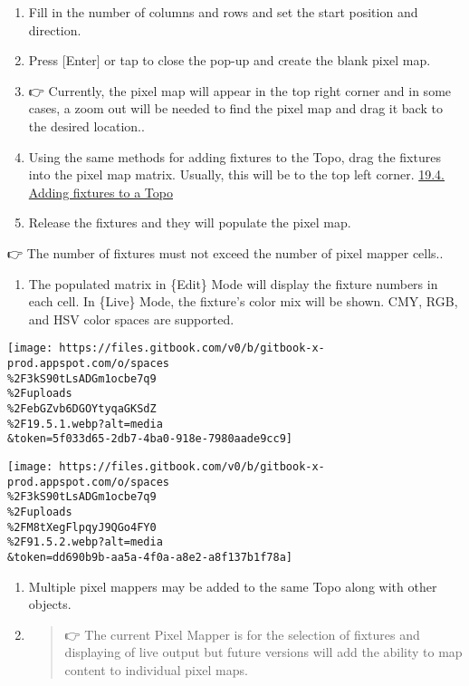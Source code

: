 \documentclass[
]{article}
\providecommand{\tightlist}{%
  \setlength{\itemsep}{0pt}\setlength{\parskip}{0pt}}
\begin{document}
\begin{enumerate}
\def\labelenumi{\arabic{enumi}.}
\setcounter{enumi}{2}
\item
  Fill in the number of columns and rows and set the start position and direction.
\item
  Press {[}Enter{]} or tap \href{image.png}{} to close the pop-up and create the blank pixel map.
\item
  👉 {Currently, the pixel map will appear in the top right corner and in some cases, a zoom out will be needed to find the pixel map and drag it back to the desired location.}.
\item
  Using the same methods for adding fixtures to the Topo, drag the fixtures into the pixel map matrix. Usually, this will be to the top left corner. \href{https://vibemanual.compulite.com/topo-topographical-display.html\#adding-fixtures-to-a-topo}{19.4. Adding fixtures to a Topo}
\item
  Release the fixtures and they will populate the pixel map.
\end{enumerate}

👉 {The number of fixtures must not exceed the number of pixel mapper cells.}.

\begin{enumerate}
\def\labelenumi{\arabic{enumi}.}
\setcounter{enumi}{4}
\tightlist
\item
  The populated matrix in \{Edit\} Mode will display the fixture numbers in each cell. In \{Live\} Mode, the fixture's color mix will be shown. CMY, RGB, and HSV color spaces are supported.
\end{enumerate}

\texttt{[image: https://files.gitbook.com/v0/b/gitbook-x-prod.appspot.com/o/spaces\\\%2F3kS90tLsADGm1ocbe7q9\\\%2Fuploads\\\%2FebGZvb6DGOYtyqaGKSdZ\\\%2F19.5.1.webp?alt=media\\\&token=5f033d65-2db7-4ba0-918e-7980aade9cc9]}

\texttt{[image: https://files.gitbook.com/v0/b/gitbook-x-prod.appspot.com/o/spaces\\\%2F3kS90tLsADGm1ocbe7q9\\\%2Fuploads\\\%2FM8tXegFlpqyJ9QGo4FY0\\\%2F91.5.2.webp?alt=media\\\&token=dd690b9b-aa5a-4f0a-a8e2-a8f137b1f78a]}

\begin{enumerate}
\def\labelenumi{\arabic{enumi}.}
\item
  Multiple pixel mappers may be added to the same Topo along with other objects.
\item
  \begin{quote}
  👉 The current Pixel Mapper is for the selection of fixtures and displaying of live output but future versions will add the ability to map content to individual pixel maps.
  \end{quote}
\end{enumerate}
\end{document}
